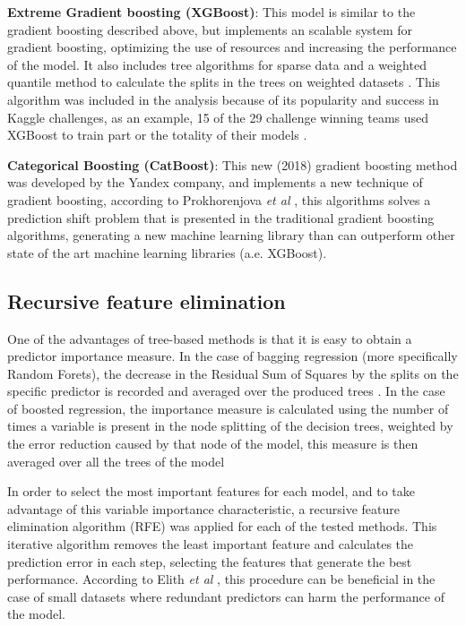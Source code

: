 \documentclass[11pt,onecolumn,titlepage,letterpaper]{article}
\begin{document}
\textbf{Extreme Gradient boosting (XGBoost)}: This model is similar to the gradient boosting described above, but implements an scalable system for gradient boosting, optimizing the use of resources and increasing the performance of the model. It also includes tree algorithms for sparse data and a weighted quantile method to calculate the splits in the trees on weighted datasets \cite{Chen2016}. This algorithm was included in the analysis because of its popularity and success in Kaggle challenges, as an example, 15 of the 29 challenge winning teams used XGBoost to train part or the totality of their models \cite{Chen2016}.

\textbf{Categorical Boosting (CatBoost)}: This new (2018) gradient boosting method was developed by the Yandex company, and implements a new technique of gradient boosting, according to Prokhorenjova \textit{et al} \cite{Prokhorenkova2018a}, this algorithms solves a prediction shift problem that is presented in the traditional gradient boosting algorithms, generating a new machine learning library than can outperform other state of the art machine learning libraries (a.e. XGBoost).

\subsection{Recursive feature elimination}

One of the advantages of tree-based methods is that it is easy to obtain a predictor importance measure. In the case of bagging regression (more specifically Random Forets), the decrease in the Residual Sum of Squares by the splits on the specific predictor is recorded and averaged over the produced trees \cite{James2013}. In the case of boosted regression, the importance measure is calculated using the number of times a variable is present in the node splitting of the decision trees, weighted by the error reduction caused by that node of the model, this measure is then averaged over all the trees of the model \cite{Elith2008}

In order to select the most important features for each model, and to take advantage of this variable importance characteristic, a recursive feature elimination algorithm (RFE) was applied for each of the tested methods. This iterative algorithm removes the least important feature and calculates the prediction error in each step, selecting the features that generate the best performance. According to Elith \textit{et al} \cite{Elith2008}, this procedure can be beneficial in the case of small datasets where redundant predictors can harm the performance of the model.
\end{document}
